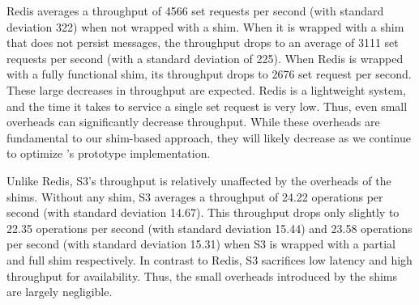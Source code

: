 Redis averages a throughput of 4566 set requests per second (with standard
deviation 322) when not wrapped with a \fluent{} shim. When it is wrapped with
a \fluent{} shim that does not persist messages, the throughput drops to an
average of 3111 set requests per second (with a standard deviation of 225).
When Redis is wrapped with a fully functional shim, its throughput drops to
2676 set request per second. These large decreases in throughput are expected.
Redis is a lightweight system, and the time it takes to service a single set
request is very low. Thus, even small overheads can significantly decrease
throughput.  While these overheads are fundamental to our shim-based approach,
they will likely decrease as we continue to optimize \fluent{}'s prototype
implementation.

Unlike Redis, S3's throughput is relatively unaffected by the overheads of the
shims. Without any shim, S3 averages a throughput of 24.22 operations per
second (with standard deviation 14.67). This throughput drops only slightly to
22.35 operations per second (with standard deviation 15.44) and 23.58
operations per second (with standard deviation 15.31) when S3 is wrapped with a
partial and full\fluent{} shim respectively. In contrast to Redis, S3
sacrifices low latency and high throughput for availability. Thus, the small
overheads introduced by the shims are largely negligible.
